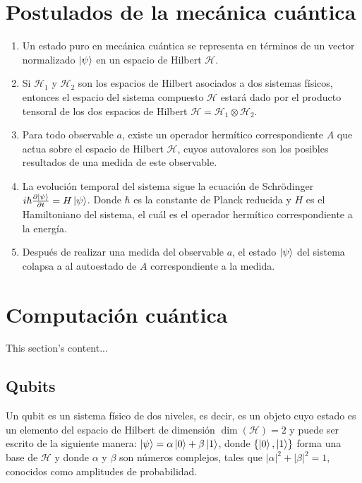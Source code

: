 \documentclass[11pt, spanish]{report}
\begin{document}
\section{Postulados de la mecánica cuántica}
\begin{enumerate}
\item Un estado puro en mecánica cuántica se representa en términos de
  un vector normalizado $\ket{\psi}$ en un espacio de Hilbert
  $\mathcal{H}$.
\item Si $\mathcal{H}_1$ y $\mathcal{H}_2$ son los espacios de Hilbert asociados a dos sistemas físicos, entonces el espacio del sistema
  compuesto $\mathcal{H}$ estará dado por el producto tensoral de los
  dos espacios de Hilbert
  $\mathcal{H} = \mathcal{H}_1 \otimes \mathcal{H}_2$.
\item Para todo observable $a$, existe un operador hermítico
  correspondiente $A$ que actua sobre el espacio de Hilbert
  $\mathcal{H}$, cuyos autovalores son los posibles resultados de una
  medida de este observable.
\item La evolución temporal del sistema sigue la ecuación de
  Schrödinger
  $i \hbar \frac{\partial \ket{\psi}}{\partial t} = H
  \ket{\psi}$. Donde $\hbar$ es la constante de Planck reducida y $H$
  es el Hamiltoniano del sistema, el cuál es el operador hermítico
  correspondiente a la energía.
\item Después de realizar una medida del observable $a$, el estado
  $\ket{\psi}$ del sistema colapsa a al autoestado de $A$
  correspondiente a la medida.
\end{enumerate}

\section{Computación cuántica}
This section's content...

\subsection{Qubits}
Un qubit es un sistema físico de dos niveles, es decir, es un objeto cuyo estado es un elemento del espacio de Hilbert de dimensión $\dim (\mathcal{H})=2$ y puede ser escrito de la siguiente manera: $ \ket{\psi} = \alpha \ket{0} + \beta \ket{1} $, donde $ \{ \ket{0},\ket{1} \} $ forma una base de $\mathcal{H}$ y donde $ \alpha $ y $ \beta $ son números complejos, tales que $ | \alpha |^2 + | \beta |^2 = 1 $, conocidos como amplitudes de probabilidad.
\vspace{0.5cm}
\end{document}
